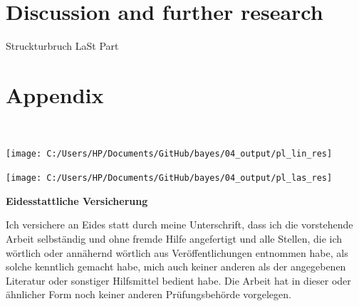 \documentclass[12pt,a4paper]{article}
\let\origfigure\figure
\let\endorigfigure\endfigure
\renewenvironment{figure}[1][2] {
    \expandafter\origfigure\expandafter[H]
} {
    \endorigfigure
}
\begin{document}
\newpage

\hypertarget{discussion-and-further-research}{%
\section{Discussion and further
research}\label{discussion-and-further-research}}

Struckturbruch LaSt Part

\newpage

\hypertarget{appendix}{%
\section{Appendix}\label{appendix}}

\(\quad\)

\begin{figure}

\texttt{[image: C:/Users/HP/Documents/GitHub/bayes/04\_output/pl\_lin\_res]} \hfill{}

\caption{ \label{fig:res_lm} Plot of the Residuals vs Fitted Values for the Linear Model}\label{fig:fig3}
\end{figure}

\begin{figure}

\texttt{[image: C:/Users/HP/Documents/GitHub/bayes/04\_output/pl\_las\_res]} \hfill{}

\caption{ \label{fig:res_lasso} Plot of the Residuals vs Fitted Values for the LASSO Model}\label{fig:fig4}
\end{figure}

\newpage
\newpage
\renewcommand*{\mkbibnamefamily}[1]{\textbf{#1}}
\renewcommand*{\mkbibnamegiven}[1]{\textbf{#1}}
\renewcommand*{\mkbibnameprefix}[1]{\textbf{#1}}
\renewcommand*{\mkbibnamesuffix}[1]{\textbf{#1}}


\printbibliography[title=References]


\newpage
\textbf{Eidesstattliche Versicherung}

\bigskip

Ich versichere an Eides statt durch meine Unterschrift, dass ich die vorstehende Arbeit selbständig und ohne fremde Hilfe angefertigt und alle Stellen, die ich wörtlich oder annähernd wörtlich aus Veröffentlichungen entnommen habe, als solche kenntlich gemacht habe, mich auch keiner anderen als der angegebenen Literatur oder sonstiger Hilfsmittel bedient habe. Die Arbeit hat in dieser oder ähnlicher Form noch keiner anderen Prüfungsbehörde vorgelegen.

\vspace{1cm}
\rule{0pt}{2\baselineskip} %
\par\noindent{} \hfill\makebox[2.25in]{\hrulefill}%
\par\noindent\makebox[2.25in][l]{} \hfill{}%
\end{document}

